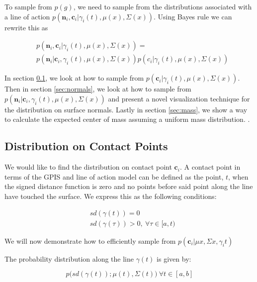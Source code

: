 \documentclass[letterpaper, 10 pt, conference]{ieeeconf}  %
\begin{document}
 To sample from $p(g)$, we need to sample from the distributions associated with a line of action $p(\textbf{n}_i,\textbf{c}_i|\gamma_i(t),\mu(x),\Sigma(x))$. Using Bayes rule we can rewrite this as 
 
 \vspace{-2ex}
 \begin{align*}
 &p(\textbf{n}_i,\textbf{c}_i|\gamma_i(t),\mu(x),\Sigma(x))=\\
 &p(\textbf{n}_i|\textbf{c}_i,\gamma_i(t),\mu(x),\Sigma(x))p(c_i|\gamma_i(t),\mu(x),\Sigma(x))
 \end{align*}
 
 In section \ref{sec:contact}, we look at how to sample from $p(\textbf{c}_i|\gamma_i(t),\mu(x),\Sigma(x))$. Then in section \ref{sec:normals}, we look at how to sample from $p(\textbf{n}_i|\textbf{c}_i,\gamma_i(t),\mu(x),\Sigma(x))$ and present a novel visualization technique for the distribution on surface normals. Lastly in section \ref{sec:mass}, we show a way to calculate the expected center of mass assuming a uniform mass distribution. 
 .
\subsection{Distribution on Contact Points}\label{sec:contact} 
We would like to find the distribution on contact point $\textbf{c}_i$. A contact point in terms of the GPIS and line of action model can be defined as the point, $t$, when the signed distance function is zero and no points before said point along the line have touched the surface. We express this as the following conditions: 

\vspace{-2ex}
\begin{align}
 &sd(\gamma(t)) = 0 \label{eq:density_cond} \\
&sd(\gamma(\tau)) > 0, \: \forall \tau \in [a,t) \label{eq:cdf_cond}
\end{align}

We will now demonstrate how to efficiently sample from $p(\textbf{c}_i|\mu{x},\Sigma{x},\gamma_i{t})$

The probability distribution along the line $\gamma(t)$ is given by:

\vspace{-2ex}
\begin{equation} \label{eq:line_of_act_dist}
p\big(sd(\gamma(t)) ; \mu(t),\Sigma(t)\big) \ \forall t \in [a,b] 
\end{equation}
\end{document}
